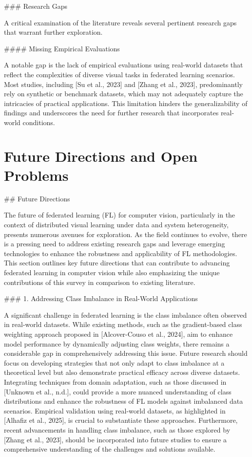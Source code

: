 \documentclass[journal]{IEEEtran}
\begin{document}
\#\#\# Research Gaps

A critical examination of the literature reveals several pertinent research gaps that warrant further exploration.

\#\#\#\# Missing Empirical Evaluations

A notable gap is the lack of empirical evaluations using real-world datasets that reflect the complexities of diverse visual tasks in federated learning scenarios. Most studies, including [Su et al., 2023] and [Zhang et al., 2023], predominantly rely on synthetic or benchmark datasets, which may not adequately capture the intricacies of practical applications. This limitation hinders the generalizability of findings and underscores the need for further research that incorporates real-world conditions.

\section{Future Directions and Open Problems}
\label{sec:future_directions}

\#\# Future Directions

The future of federated learning (FL) for computer vision, particularly in the context of distributed visual learning under data and system heterogeneity, presents numerous avenues for exploration. As the field continues to evolve, there is a pressing need to address existing research gaps and leverage emerging technologies to enhance the robustness and applicability of FL methodologies. This section outlines key future directions that can contribute to advancing federated learning in computer vision while also emphasizing the unique contributions of this survey in comparison to existing literature.

\#\#\# 1. Addressing Class Imbalance in Real-World Applications

A significant challenge in federated learning is the class imbalance often observed in real-world datasets. While existing methods, such as the gradient-based class weighting approach proposed in [Alcover-Couso et al., 2024], aim to enhance model performance by dynamically adjusting class weights, there remains a considerable gap in comprehensively addressing this issue. Future research should focus on developing strategies that not only adapt to class imbalance at a theoretical level but also demonstrate practical efficacy across diverse datasets. Integrating techniques from domain adaptation, such as those discussed in [Unknown et al., n.d.], could provide a more nuanced understanding of class distributions and enhance the robustness of FL models against imbalanced data scenarios. Empirical validation using real-world datasets, as highlighted in [Alhafiz et al., 2025], is crucial to substantiate these approaches. Furthermore, recent advancements in handling class imbalance, such as those explored by [Zhang et al., 2023], should be incorporated into future studies to ensure a comprehensive understanding of the challenges and solutions available.
\end{document}
